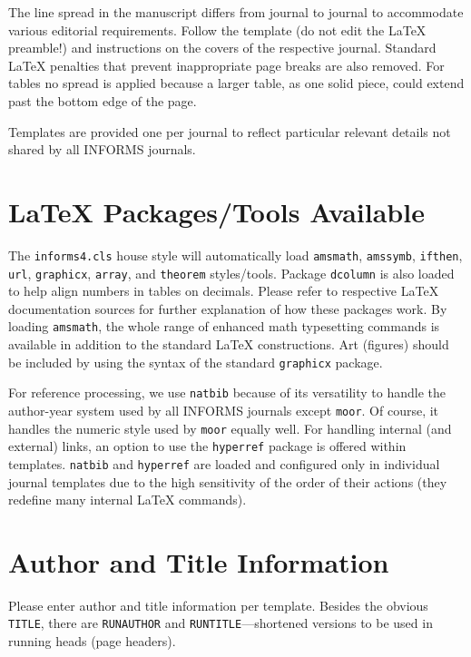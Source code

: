\documentclass[ijds,nonblindrev]{informs4}
\begin{document}
The line spread in the manuscript differs from journal to journal to 
accommodate various editorial requirements. Follow the template (do not edit 
the LaTeX preamble!) and instructions on the covers of the respective 
journal. Standard LaTeX penalties that prevent inappropriate page breaks are 
also removed. For tables no spread is applied because a larger table, as one 
solid piece, could extend past the bottom edge of the page.

Templates are provided one per journal to reflect particular relevant 
details not shared by all INFORMS journals.

\section{LaTeX Packages/Tools Available}\label{sec2}

The \texttt{informs4.cls} house style will automatically load
\texttt{amsmath}, \texttt{amssymb}, \texttt{ifthen},
\texttt{url}, \texttt{graphicx}, \texttt{array}, and \texttt{theorem} styles/tools. 
Package \texttt{dcolumn} is also loaded to help align numbers in tables 
on decimals. Please refer to respective LaTeX documentation sources for 
further explanation of how these packages work. By loading
\texttt{amsmath}, the whole range of enhanced math typesetting commands is  
available in addition to the standard LaTeX constructions. Art (figures) 
should be included by using the syntax of the standard \texttt{graphicx} package.

For reference processing, we use \texttt{natbib} because of its 
versatility to handle the author-year system used by all INFORMS journals 
except \texttt{moor}. Of course, it handles the numeric style used by 
\texttt{moor} equally well. For handling internal (and external) links, 
an option to use the \texttt{hyperref} package is offered within 
templates. \texttt{natbib} and \texttt{hyperref} are loaded and 
configured only in individual journal templates due to the high sensitivity 
of the order of their actions (they redefine many internal LaTeX commands).

\section{Author and Title Information}\label{sec3}

Please enter author and title information per template. Besides the obvious 
\texttt{TITLE}, there are \texttt{RUNAUTHOR} and
\texttt{RUNTITLE}---shortened versions to be used in running heads (page headers). 
\end{document}
